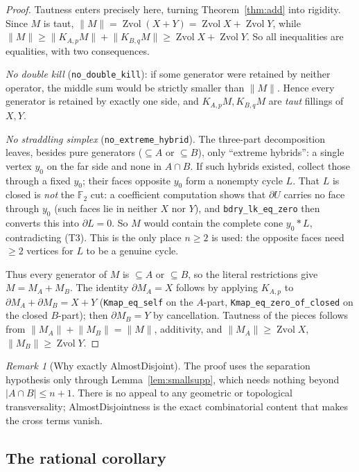 \documentclass[11pt]{article}
\theoremstyle{plain}
\theoremstyle{definition}
\theoremstyle{remark}
\newtheorem*{remark}{Remark}
\newcommand{\Zvol}{\operatorname{Zvol}}
\newcommand{\bd}{\partial}
\newcommand{\F}{\mathbb{F}}
\newcommand{\code}[1]{\texttt{#1}}
\newcommand{\card}[1]{\lvert #1\rvert}
\newcommand{\norm}[1]{\lVert #1\rVert}
\begin{document}
\begin{proof}
Tautness enters precisely here, turning Theorem~\ref{thm:add} into rigidity. Since $M$ is
taut, $\norm{M}=\Zvol(X+Y)=\Zvol X+\Zvol Y$, while
$\norm{M}\ge\norm{K_{A,p}M}+\norm{K_{B,q}M}\ge\Zvol X+\Zvol Y$. So all inequalities are
equalities, with two consequences.

\emph{No double kill} (\code{no\_double\_kill}): if some generator were retained by neither
operator, the middle sum would be strictly smaller than $\norm M$. Hence every generator is
retained by exactly one side, and $K_{A,p}M,K_{B,q}M$ are \emph{taut} fillings of $X,Y$.

\emph{No straddling simplex} (\code{no\_extreme\_hybrid}). The three-part decomposition
leaves, besides pure generators ($\subseteq A$ or $\subseteq B$), only ``extreme hybrids'':
a single vertex $y_0$ on the far side and none in $A\cap B$. If such hybrids existed,
collect those through a fixed $y_0$; their faces opposite $y_0$ form a nonempty cycle $L$.
That $L$ is closed is \emph{not} the $\F_2$ cut: a coefficient computation shows that $\bd U$
carries no face through $y_0$ (such faces lie in neither $X$ nor $Y$), and \code{bdry\_lk\_eq\_zero}
then converts this into $\bd L=0$. So $M$ would contain the complete cone $y_0\ast L$,
contradicting (T3). This is the only place $n\ge 2$ is used:
the opposite faces need $\ge 2$ vertices for $L$ to be a genuine cycle.

Thus every generator of $M$ is $\subseteq A$ or $\subseteq B$, so the literal restrictions give
$M=M_A+M_B$. The identity $\bd M_A=X$ follows by applying $K_{A,p}$ to $\bd M_A+\bd M_B=X+Y$
(\code{Kmap\_eq\_self} on the $A$-part, \code{Kmap\_eq\_zero\_of\_closed} on the closed $B$-part);
then $\bd M_B=Y$ by cancellation. Tautness of the pieces follows from $\norm{M_A}+\norm{M_B}=\norm M$,
additivity, and $\norm{M_A}\ge\Zvol X$, $\norm{M_B}\ge\Zvol Y$.
\end{proof}

\begin{remark}[Why exactly AlmostDisjoint]
The proof uses the separation hypothesis only through Lemma~\ref{lem:smallsupp}, which needs
nothing beyond $\card{A\cap B}\le n+1$. There is no appeal to any geometric or topological
transversality; AlmostDisjointness is the exact combinatorial content that makes the cross
terms vanish.
\end{remark}

\subsection*{The rational corollary}
\end{document}
